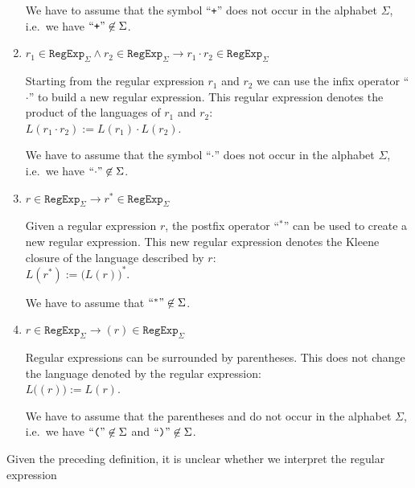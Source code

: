 \begin{Definition}
\begin{enumerate}
        We have to assume that the symbol  ``\texttt{+}'' does not occur in the alphabet $\Sigma$, i.e.~we have  $\mbox{``\texttt{+}''} \not\in \Sigma$.
  \item $r_1 \in \texttt{RegExp}_\Sigma \wedge r_2 \in \texttt{RegExp}_\Sigma 
         \rightarrow r_1 \cdot r_2 \in \texttt{RegExp}_\Sigma$

        Starting from the regular expression $r_1$ and $r_2$ we can use the  infix operator
        ``$\cdot$'' to build a new regular expression.  This regular expression denotes
        the product of the languages of $r_1$ and $r_2$:
        \\[0.2cm]
        \hspace*{1.3cm}
        $L(r_1 \cdot r_2) := L(r_1) \cdot L(r_2)$.

        We have to assume that the symbol ``$\cdot$'' does not occur in the alphabet $\Sigma$, i.e.~we have $\mbox{``\texttt{$\cdot$}''} \not\in \Sigma$.
  \item $r \in \texttt{RegExp}_\Sigma \rightarrow r^* \in \texttt{RegExp}_\Sigma$

        Given a regular expression $r$, the postfix operator
        ``$^*$'' can be used to create a new regular expression.  This new regular expression
        denotes the Kleene closure of the language described by  $r$:
        \\[0.2cm]
        \hspace*{1.3cm}
        $L(r^*) := \bigl(L(r)\bigr)^*$.

        We have to assume that $\mbox{``\texttt{$^*$}''} \not\in \Sigma$. 
  \item $r \in \texttt{RegExp}_\Sigma \rightarrow (r) \in \texttt{RegExp}_\Sigma$

        Regular expressions can be surrounded by parentheses.  This does not change the language
        denoted by the regular expression:
        \\[0.2cm]
        \hspace*{1.3cm}
        $L\bigl((r)\bigr) := L(r)$. 

        We have to assume that the parentheses  \qote{(} and \qote{)} do not occur
        in the alphabet $\Sigma$, i.e.~we have $\mbox{``\texttt{(}''} \not\in \Sigma$  and $\mbox{``\texttt{)}''} \not\in \Sigma$. \eox
  \end{enumerate}
\end{Definition}
Given the preceding definition, it is unclear whether we interpret the regular expression
\\[0.2cm]
\hspace*{1.3cm}
